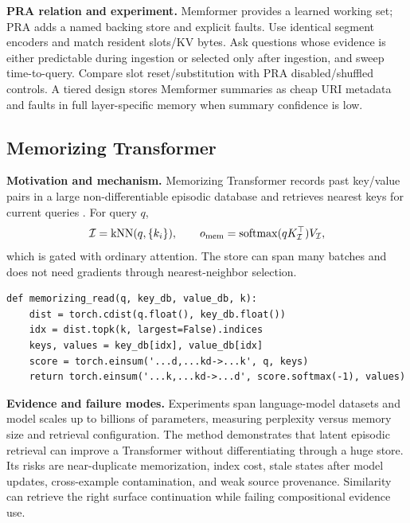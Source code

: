 \textbf{PRA relation and experiment.} Memformer provides a learned working set; PRA adds a
named backing store and explicit faults.  Use identical segment encoders and match resident
slots/KV bytes.  Ask questions whose evidence is either predictable during ingestion or
selected only after ingestion, and sweep time-to-query.  Compare slot reset/substitution
with PRA disabled/shuffled controls.  A tiered design stores Memformer summaries as cheap
URI metadata and faults in full layer-specific memory when summary confidence is low.

\subsection{Memorizing Transformer}

\textbf{Motivation and mechanism.} Memorizing Transformer records past key/value pairs in
a large non-differentiable episodic database and retrieves nearest keys for current queries
\citep{wu2022memorizing}.  For query $q$,
\begin{equation}
\mathcal I=\operatorname{kNN}(q,\{k_i\}),\qquad
o_{\rm mem}=\operatorname{softmax}(qK_{\mathcal I}^\top)V_{\mathcal I},
\end{equation}
which is gated with ordinary attention.  The store can span many batches and does not need
gradients through nearest-neighbor selection.

\begin{lstlisting}[caption={Episodic KV retrieval; an ANN index replaces the dense distance}]
def memorizing_read(q, key_db, value_db, k):
    dist = torch.cdist(q.float(), key_db.float())
    idx = dist.topk(k, largest=False).indices
    keys, values = key_db[idx], value_db[idx]
    score = torch.einsum('...d,...kd->...k', q, keys)
    return torch.einsum('...k,...kd->...d', score.softmax(-1), values)
\end{lstlisting}

\textbf{Evidence and failure modes.} Experiments span language-model datasets and model
scales up to billions of parameters, measuring perplexity versus memory size and retrieval
configuration.  The method demonstrates that latent episodic retrieval can improve a
Transformer without differentiating through a huge store.  Its risks are near-duplicate
memorization, index cost, stale states after model updates, cross-example contamination,
and weak source provenance.  Similarity can retrieve the right surface continuation while
failing compositional evidence use.

